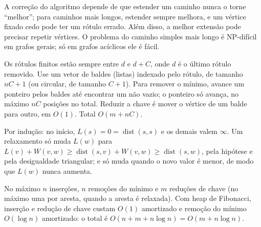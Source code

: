  A correção do algoritmo depende de que estender um caminho nunca o torne ``melhor''; para caminhos mais longos, estender sempre melhora, e um vértice fixado cedo pode ter um rótulo errado. Além disso, a melhor extensão pode precisar repetir vértices. O problema do caminho simples mais longo é NP-difícil em grafos gerais; só em grafos acíclicos ele é fácil.

 Os rótulos finitos estão sempre entre $d$ e $d+C$, onde $d$ é o último rótulo removido. Use um vetor de baldes (listas) indexado pelo rótulo, de tamanho $nC+1$ (ou circular, de tamanho $C+1$). Para remover o mínimo, avance um ponteiro pelos baldes até encontrar um não vazio; o ponteiro só avança, no máximo $nC$ posições no total. Reduzir a chave é mover o vértice de um balde para outro, em $O(1)$. Total $O(m+nC)$.

 Por indução: no início, $L(s)=0=\operatorname{dist}(s,s)$ e os demais valem $\infty$. Um relaxamento só muda $L(w)$ para $L(v)+W(v,w)\ge\operatorname{dist}(s,v)+W(v,w)\ge\operatorname{dist}(s,w)$, pela hipótese e pela desigualdade triangular; e só muda quando o novo valor é menor, de modo que $L(w)$ nunca aumenta.

 No máximo $n$ inserções, $n$ remoções do mínimo e $m$ reduções de chave (no máximo uma por aresta, quando a aresta é relaxada). Com heap de Fibonacci, inserção e redução de chave custam $O(1)$ amortizado e remoção do mínimo $O(\log n)$ amortizado: o total é $O(n+m+n\log n)=O(m+n\log n)$.
